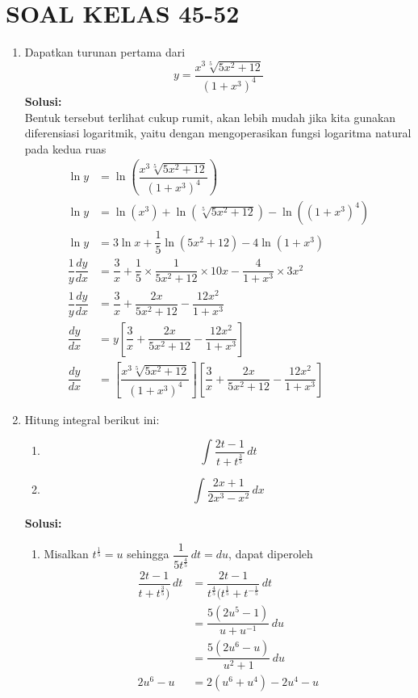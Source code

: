 \documentclass{article}
\begin{document}
\section*{SOAL KELAS 45-52}
\begin{enumerate}
	\item Dapatkan turunan pertama dari $$ y= \dfrac{x^3\sqrt[5]{5x^2+12}}{(1+x^3)^4} $$
	\textbf{Solusi:}\\
	Bentuk tersebut terlihat cukup rumit, akan lebih mudah jika kita gunakan diferensiasi logaritmik, yaitu dengan mengoperasikan fungsi logaritma natural pada kedua ruas
	\begin{align*}
	\ln y &= \ln\left(\dfrac{x^3\sqrt[5]{5x^2+12}}{(1+x^3)^4}\right)\\
	\ln y &= \ln (x^3) +\ln (\sqrt[5]{5x^2+12}) -\ln((1+x^3)^4)\\
	\ln y &= 3\ln x+\dfrac{1}{5}\ln(5x^2+12)-4\ln(1+x^3)\\
	\dfrac{1}{y}\dfrac{dy}{dx} &= \dfrac{3}{x} + \dfrac{1}{5}\times \dfrac{1}{5x^2+12}\times 10x -\dfrac{4}{1+x^3}\times 3x^2\\
	\dfrac{1}{y}\dfrac{dy}{dx} &= \dfrac{3}{x} + \dfrac{2x}{5x^2+12}-\dfrac{12x^2}{1+x^3}\\
	\dfrac{dy}{dx} &= y\left[\dfrac{3}{x} + \dfrac{2x}{5x^2+12}-\dfrac{12x^2}{1+x^3}\right] \\
	\dfrac{dy}{dx} &= \left[\dfrac{x^3\sqrt[5]{5x^2+12}}{(1+x^3)^4}\right]\left[\dfrac{3}{x} + \dfrac{2x}{5x^2+12}-\dfrac{12x^2}{1+x^3}\right]
	\end{align*}
	\item Hitung integral berikut ini:
	\begin{enumerate}
		\item $$ \int \dfrac{2t-1}{t+t^{\frac{3}{5}}}\, dt $$
		\item $$ \int \dfrac{2x+1}{2x^3-x^2}\, dx$$
	\end{enumerate}
	\textbf{Solusi:}\\
	\begin{enumerate}
		\item Misalkan $t^\frac{1}{5}=u$ sehingga $\dfrac{1}{5t^{\frac{4}{5}}}\, dt = du$, dapat diperoleh
		\begin{align*}
		\dfrac{2t-1}{t+t^\frac{3}{5})}\, dt &= \dfrac{2t-1}{t^\frac{4}{5}(t^\frac{1}{5}+t^{-\frac{1}{5}}}\, dt\\
		&= \dfrac{5(2u^5-1)}{u+u^{-1}}\, du\\
		&= \dfrac{5(2u^6-u)}{u^2+1}\, du\\
		2u^6-u &= 2(u^6+u^4)-2u^4-u\\

\end{align*}
\end{enumerate}
\end{enumerate}
\end{document}

